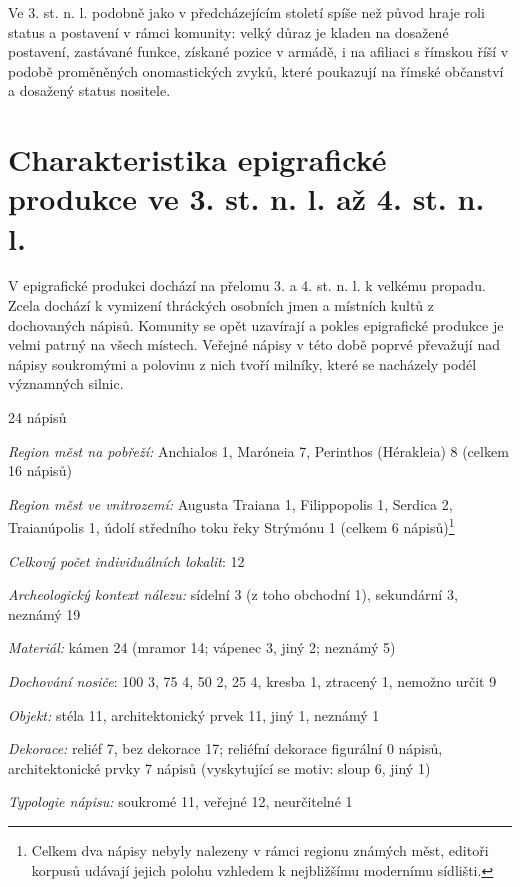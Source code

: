 Ve 3. st. n. l. podobně jako v předcházejícím století spíše než původ hraje roli status a postavení v rámci komunity: velký důraz je kladen na dosažené postavení, zastávané funkce, získané pozice v armádě, i na afiliaci s římskou říší v podobě proměněných onomastických zvyků, které poukazují na římské občanství a dosažený status nositele.

\section[charakteristika-epigrafické-produkce-ve-3.-st.-n.-l.-až-4.-st.-n.-l.]{Charakteristika epigrafické produkce ve 3. st. n. l. až 4. st. n. l.}

V epigrafické produkci dochází na přelomu 3. a 4. st. n. l. k velkému propadu. Zcela dochází k vymizení thráckých osobních jmen a místních kultů z dochovaných nápisů. Komunity se opět uzavírají a pokles epigrafické produkce je velmi patrný na všech místech. Veřejné nápisy v této době poprvé převažují nad nápisy soukromými a polovinu z nich tvoří milníky, které se nacházely podél významných silnic.

\placetable[none]{}
\starttable[|l|]
\HL
{} 24 nápisů

{\em Region měst na pobřeží:} Anchialos 1, Maróneia 7, Perinthos (Hérakleia) 8 (celkem 16 nápisů)

{\em Region měst ve vnitrozemí:} Augusta Traiana 1, Filippopolis 1, Serdica 2, Traianúpolis 1, údolí středního toku řeky Strýmónu 1 (celkem 6 nápisů)\footnote{Celkem dva nápisy nebyly nalezeny v rámci regionu známých měst, editoři korpusů udávají jejich polohu vzhledem k nejbližšímu modernímu sídlišti.}

{\em Celkový počet individuálních lokalit}: 12

{\em Archeologický kontext nálezu:} sídelní 3 (z toho obchodní 1), sekundární 3, neznámý 19

{\em Materiál:} kámen 24 (mramor 14; vápenec 3, jiný 2; neznámý 5)

{\em Dochování nosiče}: 100  3, 75  4, 50  2, 25  4, kresba 1, ztracený 1, nemožno určit 9

{\em Objekt:} stéla 11, architektonický prvek 11, jiný 1, neznámý 1

{\em Dekorace:} reliéf 7, bez dekorace 17; reliéfní dekorace figurální 0 nápisů, architektonické prvky 7 nápisů (vyskytující se motiv: sloup 6, jiný 1)

{\em Typologie nápisu:} soukromé 11, veřejné 12, neurčitelné 1

